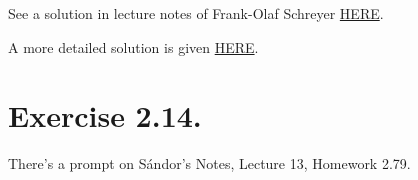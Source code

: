 See a solution in lecture notes of Frank-Olaf Schreyer \href{https://www.math.uni-sb.de/ag/schreyer/images/PDFs/teaching/ss21_perugia/AlgGeomSlides19.pdf}{HERE}.

A more detailed solution is given \href{http://therisingsea.org/notes/hartshorne1-2.pdf}{HERE}.

\section{Exercise 2.14.}

There's a prompt on S\'andor's Notes, Lecture 13, Homework 2.79.